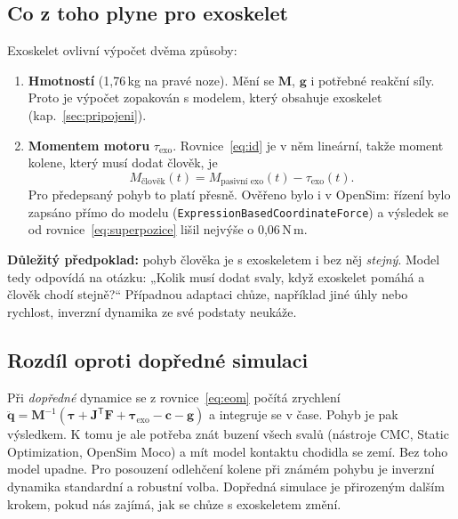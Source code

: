 \documentclass[11pt,a4paper]{article}
\newcommand{\Nm}{\,N\,m}
\begin{document}
\subsection{Co z toho plyne pro exoskelet}
Exoskelet ovlivní výpočet dvěma způsoby:
\begin{enumerate}
  \item \textbf{Hmotností} (1,76\,kg na pravé noze). Mění se $\mathbf M$, $\mathbf g$ i potřebné reakční
        síly. Proto je výpočet zopakován s modelem, který obsahuje exoskelet (kap.~\ref{sec:pripojeni}).
  \item \textbf{Momentem motoru} $\tau_{\text{exo}}$. Rovnice~\eqref{eq:id} je v něm
        lineární, takže moment kolene, který musí dodat člověk, je
        \begin{equation}
          M_{\text{člověk}}(t) = M_{\text{pasivní exo}}(t) - \tau_{\text{exo}}(t).
          \label{eq:superpozice}
        \end{equation}
        Pro předepsaný pohyb to platí přesně. Ověřeno bylo i v OpenSim: řízení bylo zapsáno
        přímo do modelu (\texttt{ExpressionBasedCoordinateForce}) a výsledek se od
        rovnice~\eqref{eq:superpozice} lišil nejvýše o 0,06\Nm.
\end{enumerate}

\noindent\textbf{Důležitý předpoklad:} pohyb člověka je s exoskeletem i bez něj \emph{stejný}.
Model tedy odpovídá na otázku: „Kolik musí dodat svaly, když exoskelet pomáhá a člověk chodí stejně?“
Případnou adaptaci chůze, například jiné úhly nebo rychlost, inverzní dynamika ze své podstaty neukáže.

\subsection{Rozdíl oproti dopředné simulaci}
Při \emph{dopředné} dynamice se z rovnice~\eqref{eq:eom} počítá zrychlení
$\ddot{\mathbf q} = \mathbf M^{-1}(\boldsymbol\tau + \mathbf J^{\mathsf T}\mathbf F + \boldsymbol\tau_{\text{exo}} - \mathbf c - \mathbf g)$
a integruje se v čase. Pohyb je pak výsledkem. K tomu je ale potřeba znát buzení všech svalů
(nástroje CMC, Static Optimization, OpenSim Moco) a mít model kontaktu chodidla se zemí.
Bez toho model upadne. Pro posouzení odlehčení kolene při známém pohybu je inverzní dynamika
standardní a robustní volba. Dopředná simulace je přirozeným dalším krokem, pokud nás zajímá,
jak se chůze s exoskeletem změní.

\end{document}
